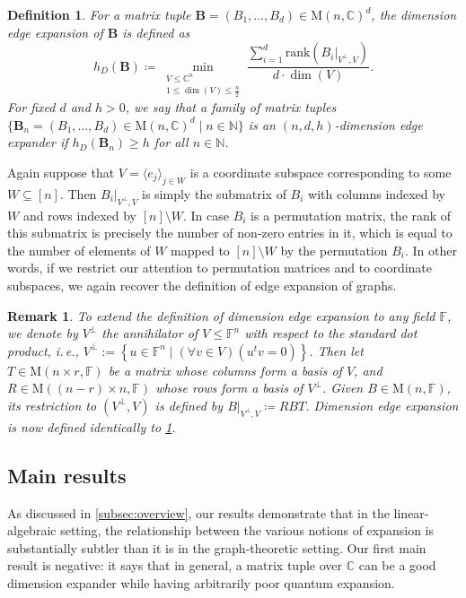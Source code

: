 \documentclass[11pt]{article}
\newtheorem{definition}[theorem]{Definition}
\newtheorem{remark}[theorem]{Remark}
\newcommand{\N}{{\mathbb N}}
\newcommand{\ie}{i.\,e.}
\theoremstyle{plain}
\numberwithin{equation}{section}
\theoremstyle{definition}
\newcommand{\F}{\mathbb{F}}
\newcommand{\bC}{\mathbb{C}}
\newcommand{\rk}{\mathrm{rank}}
\newcommand{\M}{\mathrm{M}}
\newcommand{\tuple}[1]{\mathbf{#1}}
\newcommand{\vB}{\tuple{B}}
\begin{document}
\begin{definition}\label{def:dim_edge_exp}
For a matrix tuple $\vB=(B_1, \dots, B_d)\in\M(n, \bC)^d$, the \emph{dimension edge expansion} of $\vB$ is defined as
\begin{equation}\label{eq: dim edge expansion}
    h_D(\vB)\coloneqq\min_{\substack{V \leq \bC^n\\
            1\leq\dim(V)\leq \frac n2}}\frac{\sum_{i=1}^d\rk(B_i|_{V^\perp, V})}{d\cdot\dim(V)}.
\end{equation}
For fixed $d$ and $h>0$, we say that a family of matrix tuples $\{\vB_n=(B_1, \dots, B_d)\in \M(n, \bC)^d\mid n\in \N\}$ is an \emph{$(n,d,h)$-dimension edge expander} if $h_D(\vB_n)\geq h$ for all $n\in\N$. 
\end{definition}
Again suppose that $V=\langle e_j\rangle_{j \in W}$ is a coordinate subspace corresponding to some $W \subseteq [n]$.
Then $B_i|_{V^\perp,V}$ is simply the submatrix of $B_i$ with columns indexed by $W$ and rows indexed by $[n] \setminus W$. In case $B_i$ is a permutation matrix, the rank of this submatrix is precisely the number of non-zero entries in it, which is equal to the number of elements of $W$ mapped to $[n] \setminus W$ by the permutation $B_i$. In other words, if we restrict our attention to permutation matrices and to coordinate subspaces, we again recover the definition of edge expansion of graphs.

\begin{remark}\label{rmk:def-annihilator}
  To extend the definition of dimension edge expansion to any field $\F$, we denote by $V^\perp$ the \emph{annihilator} of $V\leq \F^n$ with respect to the standard dot product, 
%
\ie,     %
%
$V^{\perp}:=\left\{u \in\mathbb{F}^n \mid (\forall v\in V)(u^t v=0)\right\}$. %
Then let $T\in \M(n\times r, \F)$ be a matrix whose columns form a basis of $V$, and $R\in \M((n-r)\times n, \F)$ whose rows form a basis of $V^\perp$. Given $B \in \M(n,\F)$, its restriction to $(V^\perp, V)$ is defined by $B|_{V^\perp, V}\coloneqq RBT$. Dimension edge expansion is now defined identically to \cref{def:dim_edge_exp}.
\end{remark}

\subsection{Main results}
As discussed in \cref{subsec:overview}, our results demonstrate that in the linear-algebraic setting, the relationship between the various notions of expansion is substantially subtler than it is in the graph-theoretic setting. Our first main result is negative: it says that in general, a matrix tuple over $\bC$ can be a good dimension expander while having arbitrarily poor quantum expansion. 
\end{document}
